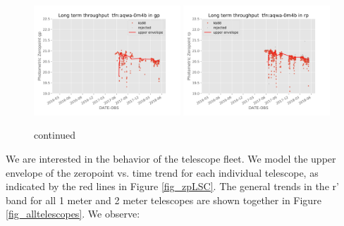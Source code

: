 \documentclass[]{spieman}
\begin{document}
\begin{figure}
\includegraphics[width=0.49\textwidth]{images/photzptrend-tfn-aqwa-0m4b-gp.png} \hspace*{\fill}
\includegraphics[width=0.49\textwidth]{images/photzptrend-tfn-aqwa-0m4b-rp.png} \\[1ex]
\caption {continued}
\end{figure}


We are interested in the behavior of the telescope fleet. We model the upper
envelope of the zeropoint vs. time trend for each individual telescope, as indicated by the red
lines in Figure \ref{fig_zpLSC}. The general trends in the r' band for all 1 meter and 2 meter telescopes
are shown together in Figure \ref{fig_alltelescopes}. We observe:
\end{document}
